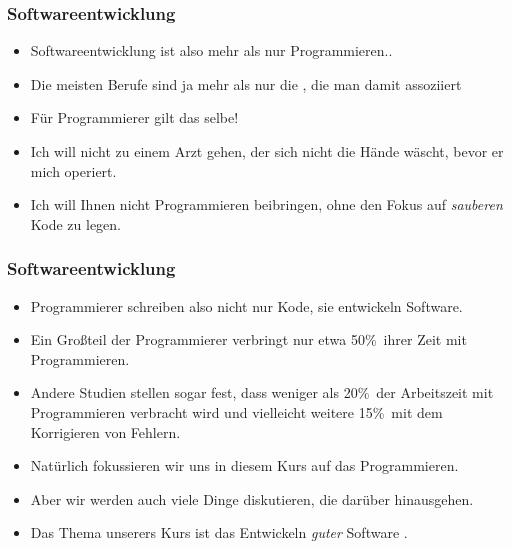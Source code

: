 \documentclass[aspectratio=169,mathserif,notheorems]{beamer}%
\begin{document}
\begin{frame}%
\frametitle{Softwareentwicklung}%
\begin{itemize}%
\item Softwareentwicklung ist also mehr als nur Programmieren..%
\item<2-> Die meisten Berufe sind ja mehr als nur die , die man damit assoziiert%
\item<6-> Für Programmierer gilt das selbe!%
\item<10-> Ich will nicht zu einem Arzt gehen, der sich nicht die Hände wäscht, bevor er mich operiert.%
\item<11-> Ich will Ihnen nicht Programmieren beibringen, ohne den Fokus auf \emph{sauberen} Kode zu legen.%
\end{itemize}%
\end{frame}%
%
\begin{frame}%
\frametitle{Softwareentwicklung}%
%
\begin{itemize}%
\item Programmierer schreiben also nicht nur Kode, sie entwickeln Software.%
\item<2-> Ein Großteil der Programmierer verbringt nur etwa 50\%~ihrer Zeit mit Programmieren.%
\item<3-> Andere Studien stellen sogar fest, dass weniger als 20\%~der Arbeitszeit mit Programmieren verbracht wird und vielleicht weitere 15\%~mit dem Korrigieren von Fehlern.%
%
\item<4-> Natürlich fokussieren wir uns in diesem Kurs auf das Programmieren.%
%
\item<5-> Aber wir werden auch viele Dinge diskutieren, die darüber hinausgehen.
%
\item<8-> Das Thema unserers Kurs ist das Entwickeln \emph{guter} Software .%
\end{itemize}%
\end{frame}%
%
%
\end{document}
